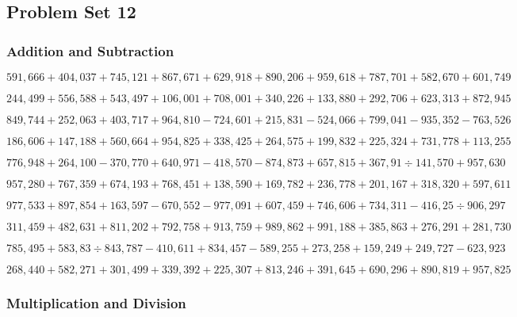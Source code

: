 \hypertarget{problem-set-12-5}{%
\subsection{Problem Set 12}\label{problem-set-12-5}}

\hypertarget{addition-and-subtraction-317}{%
\subsubsection{Addition and
Subtraction}\label{addition-and-subtraction-317}}

\(591,666+404,037+745,121+867,671+629,918+890,206+959,618+787,701+582,670+ 601,749\)

\(244,499+556,588+543,497+106,001+708,001+340,226+133,880+292,706+623,313+872,945\)

\(849,744+252,063+403,717+964,810-724,601+215,831-524,066+799,041-935,352-763,526\)

\(186,606+147,188+560,664+954,825+338,425+264,575+199,832+225,324+731,778+113,255\)

\(776,948+264,100-370,770+640,971-418,570-874,873+657,815+367,91÷141,570+957,630\)

\(957,280+767,359+674,193+768,451+138,590+169,782+236,778+201,167+318,320+597,611\)

\(977,533+897,854+163,597-670,552-977,091+607,459+746,606+734,311-416,25÷906,297\)

\(311,459+482,631+811,202+792,758+913,759+989,862+991,188+385,863+276,291+281,730\)

\(785,495+583,83÷843,787-410,611+834,457-589,255+273,258+159,249+249,727-623,923\)

\(268,440+582,271+301,499+339,392+225,307+813,246+391,645+690,296+890,819+957,825\)

\hypertarget{multiplication-and-division-316}{%
\subsubsection{Multiplication and
Division}\label{multiplication-and-division-316}}

